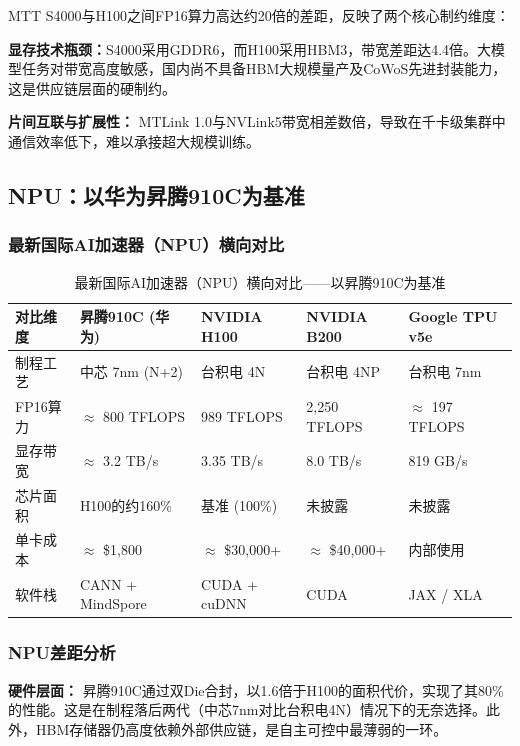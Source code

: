 \documentclass[a4paper]{article}
\begin{document}
MTT S4000与H100之间FP16算力高达约20倍的差距，反映了两个核心制约维度：

\textbf{显存技术瓶颈：}S4000采用GDDR6，而H100采用HBM3，带宽差距达4.4倍。大模型任务对带宽高度敏感，国内尚不具备HBM大规模量产及CoWoS先进封装能力，这是供应链层面的硬制约。

\textbf{片间互联与扩展性：} MTLink 1.0与NVLink5带宽相差数倍，导致在千卡级集群中通信效率低下，难以承接超大规模训练。

\subsection{NPU：以华为昇腾910C为基准}

\subsubsection{最新国际AI加速器（NPU）横向对比}

\begin{table}[H]
\centering
\caption{最新国际AI加速器（NPU）横向对比——以昇腾910C为基准}
\small
\begin{tabularx}{\textwidth}{lXXXX}
\toprule
\textbf{对比维度} & \textbf{昇腾910C (华为)} & \textbf{NVIDIA H100} & \textbf{NVIDIA B200} & \textbf{Google TPU v5e} \\
\midrule
制程工艺 & 中芯 7nm (N+2) & 台积电 4N & 台积电 4NP & 台积电 7nm \\
FP16算力 & $\approx$ 800 TFLOPS & 989 TFLOPS & 2,250 TFLOPS & $\approx$ 197 TFLOPS \\
显存带宽 & $\approx$ 3.2 TB/s & 3.35 TB/s & 8.0 TB/s & 819 GB/s \\
芯片面积 & H100的约160\% & 基准 (100\%) & 未披露 & 未披露 \\
单卡成本 & $\approx$ \$1,800 & $\approx$ \$30,000+ & $\approx$ \$40,000+ & 内部使用 \\
软件栈 & CANN + MindSpore & CUDA + cuDNN & CUDA & JAX / XLA \\
\bottomrule
\end{tabularx}
\end{table}

\subsubsection{NPU差距分析}

\textbf{硬件层面：} 昇腾910C通过双Die合封，以1.6倍于H100的面积代价，实现了其80\%的性能。这是在制程落后两代（中芯7nm对比台积电4N）情况下的无奈选择。此外，HBM存储器仍高度依赖外部供应链，是自主可控中最薄弱的一环。
\end{document}
